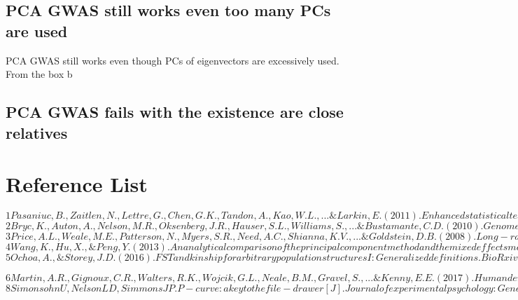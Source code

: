 \documentclass[12pt]{article}
\theoremstyle{definition}
\theoremstyle{plain}
\begin{document}
\subsection{PCA GWAS still works even too many PCs are used}
PCA GWAS still works even though PCs of eigenvectors are excessively used. From the box b



\subsection{PCA GWAS fails with the existence are close relatives }



\section{Reference List}
$
1
Pasaniuc, B., Zaitlen, N., Lettre, G., Chen, G. K., Tandon, A., Kao, W. L., ... \& Larkin, E. (2011). Enhanced statistical tests for GWAS in admixed populations: assessment using African Americans from CARe and a Breast Cancer Consortium. PLoS genetics, 7(4), e1001371.
$\\

$
2
Bryc, K., Auton, A., Nelson, M. R., Oksenberg, J. R., Hauser, S. L., Williams, S., ... \& Bustamante, C. D. (2010). Genome-wide patterns of population structure and admixture in West Africans and African Americans. Proceedings of the National Academy of Sciences, 107(2), 786-791.
$\\

$
3
Price, A. L., Weale, M. E., Patterson, N., Myers, S. R., Need, A. C., Shianna, K. V., ... \& Goldstein, D. B. (2008). Long-range LD can confound genome scans in admixed populations. The American Journal of Human Genetics, 83(1), 132-135.
$\\

$
4
Wang, K., Hu, X., \& Peng, Y. (2013). An analytical comparison of the principal component method and the mixed effects model for association studies in the presence of cryptic relatedness and population stratification. Human heredity, 76(1), 1-9.
$\\



$
5
Ochoa, A., \& Storey, J. D. (2016). FST and kinship for arbitrary population structures I: Generalized definitions. BioRxiv, 083915.
$

$
6
Martin, A. R., Gignoux, C. R., Walters, R. K., Wojcik, G. L., Neale, B. M., Gravel, S., ... \& Kenny, E. E. (2017). Human demographic history impacts genetic risk prediction across diverse populations. The American Journal of Human Genetics, 100(4), 635-649.
$\\



$
8
Simonsohn U, Nelson L D, Simmons J P. P-curve: a key to the file-drawer[J]. Journal of experimental psychology: General, 2014, 143(2): 534.
$
\end{document}
